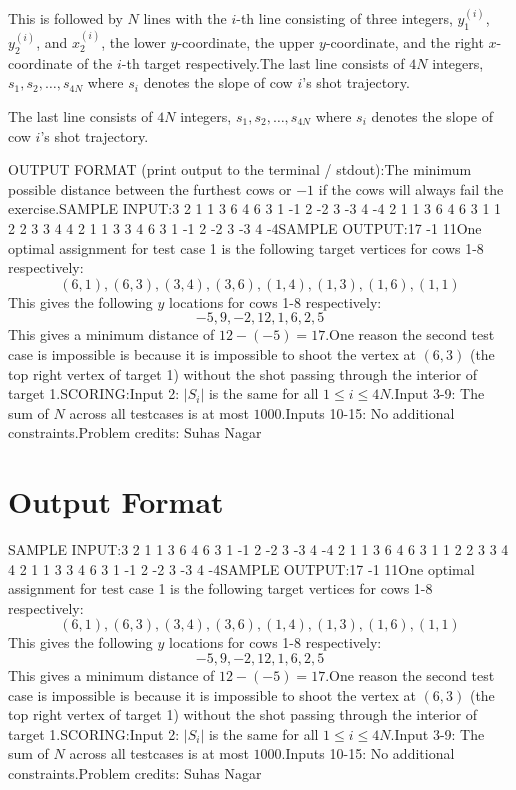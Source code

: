 \documentclass[12pt]{article}
\begin{document}
This is followed by $N$ lines with the $i$-th line consisting of three integers,
$y_1^{(i)}$, $y_2^{(i)}$, and $x_2^{(i)}$, the lower $y$-coordinate, the upper
$y$-coordinate, and the right $x$-coordinate of the $i$-th target respectively.The last line consists of $4N$ integers, $s_1, s_2, \dots, s_{4N}$ where $s_i$
denotes the slope of cow $i$'s shot trajectory.

The last line consists of $4N$ integers, $s_1, s_2, \dots, s_{4N}$ where $s_i$
denotes the slope of cow $i$'s shot trajectory.

OUTPUT FORMAT (print output to the terminal / stdout):The minimum possible distance between the furthest cows or $-1$ if the cows will
always fail the exercise.SAMPLE INPUT:3
2 1
1 3 6
4 6 3
1 -1 2 -2 3 -3 4 -4
2 1
1 3 6
4 6 3
1 1 2 2 3 3 4 4
2 1
1 3 3
4 6 3
1 -1 2 -2 3 -3 4 -4SAMPLE OUTPUT:17
-1
11One optimal assignment for test case 1 is the following target vertices for cows
1-8 respectively:$$(6, 1), (6,3), (3,4), (3,6), (1,4), (1,3), (1,6), (1,1)$$This gives the following $y$ locations for cows 1-8 respectively:$$-5, 9, -2, 12, 1, 6, 2, 5$$This gives a minimum distance of $12-(-5) = 17$.One reason the second test case is impossible is because it is impossible to
shoot the vertex at $(6, 3)$ (the top right vertex of target 1) without the shot
passing through the interior of target 1.SCORING:Input 2: $|S_i|$ is the same for all $1 \leq i \leq 4N$.Input 3-9:
The sum of $N$ across all testcases is at most $1000$.Inputs 10-15: No
additional constraints.Problem credits: Suhas Nagar

\section*{Output Format}
SAMPLE INPUT:3
2 1
1 3 6
4 6 3
1 -1 2 -2 3 -3 4 -4
2 1
1 3 6
4 6 3
1 1 2 2 3 3 4 4
2 1
1 3 3
4 6 3
1 -1 2 -2 3 -3 4 -4SAMPLE OUTPUT:17
-1
11One optimal assignment for test case 1 is the following target vertices for cows
1-8 respectively:$$(6, 1), (6,3), (3,4), (3,6), (1,4), (1,3), (1,6), (1,1)$$This gives the following $y$ locations for cows 1-8 respectively:$$-5, 9, -2, 12, 1, 6, 2, 5$$This gives a minimum distance of $12-(-5) = 17$.One reason the second test case is impossible is because it is impossible to
shoot the vertex at $(6, 3)$ (the top right vertex of target 1) without the shot
passing through the interior of target 1.SCORING:Input 2: $|S_i|$ is the same for all $1 \leq i \leq 4N$.Input 3-9:
The sum of $N$ across all testcases is at most $1000$.Inputs 10-15: No
additional constraints.Problem credits: Suhas Nagar
\end{document}
